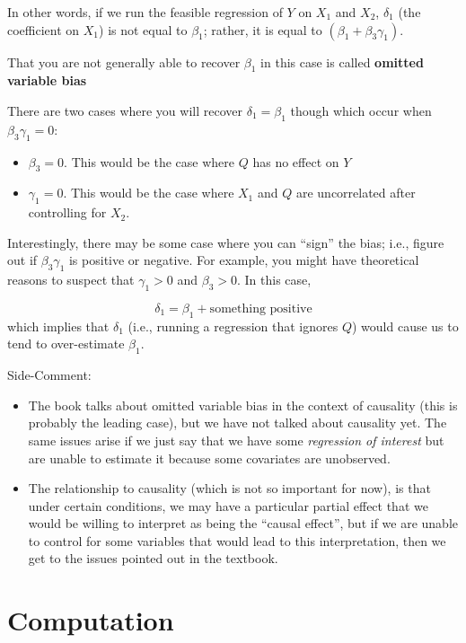 \documentclass[
  letterpaper,
  DIV=11,
  numbers=noendperiod]{scrreprt}
\begin{document}
In other words, if we run the feasible regression of \(Y\) on \(X_1\)
and \(X_2\), \(\delta_1\) (the coefficient on \(X_1\)) is not equal to
\(\beta_1\); rather, it is equal to \((\beta_1 + \beta_3 \gamma_1)\).

That you are not generally able to recover \(\beta_1\) in this case is
called \textbf{omitted variable bias}

There are two cases where you will recover \(\delta_1 = \beta_1\) though
which occur when \(\beta_3 \gamma_1 = 0\):

\begin{itemize}
\item
  \(\beta_3=0\). This would be the case where \(Q\) has no effect on
  \(Y\)
\item
  \(\gamma_1=0\). This would be the case where \(X_1\) and \(Q\) are
  uncorrelated after controlling for \(X_2\).
\end{itemize}

Interestingly, there may be some case where you can ``sign'' the bias;
i.e., figure out if \(\beta_3 \gamma_1\) is positive or negative. For
example, you might have theoretical reasons to suspect that
\(\gamma_1 > 0\) and \(\beta_3 > 0\). In this case,

\[
  \delta_1 = \beta_1 + \textrm{something positive}
\] which implies that \(\delta_1\) (i.e., running a regression that
ignores \(Q\)) would cause us to tend to over-estimate \(\beta_1\).

{Side-Comment:}

\begin{itemize}
\item
  The book talks about omitted variable bias in the context of causality
  (this is probably the leading case), but we have not talked about
  causality yet. The same issues arise if we just say that we have some
  \emph{regression of interest} but are unable to estimate it because
  some covariates are unobserved.
\item
  The relationship to causality (which is not so important for now), is
  that under certain conditions, we may have a particular partial effect
  that we would be willing to interpret as being the ``causal effect'',
  but if we are unable to control for some variables that would lead to
  this interpretation, then we get to the issues pointed out in the
  textbook.
\end{itemize}


\chapter{Computation}\label{computation-6}
\end{document}
